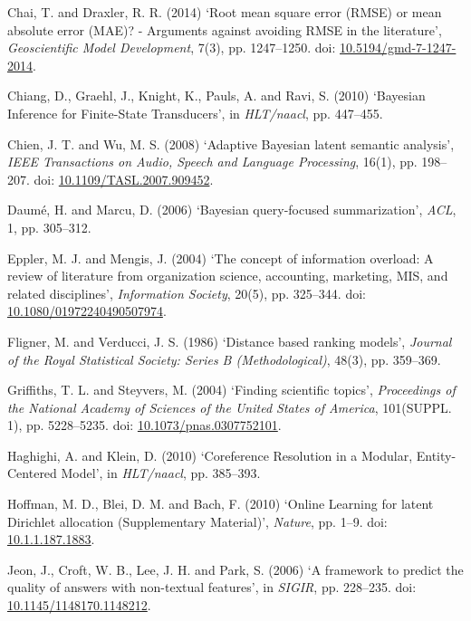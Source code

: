 \documentclass[11pt,preprint, authoryear]{article}
\begin{document}
\hypertarget{ref-Chai2014}{}
Chai, T. and Draxler, R. R. (2014) `Root mean square error (RMSE) or
mean absolute error (MAE)? - Arguments against avoiding RMSE in the
literature', \emph{Geoscientific Model Development}, 7(3), pp.
1247--1250. doi:
\href{https://doi.org/10.5194/gmd-7-1247-2014}{10.5194/gmd-7-1247-2014}.

\hypertarget{ref-Chiang2010}{}
Chiang, D., Graehl, J., Knight, K., Pauls, A. and Ravi, S. (2010)
`Bayesian Inference for Finite-State Transducers', in \emph{HLT/naacl},
pp. 447--455.

\hypertarget{ref-Chien2008}{}
Chien, J. T. and Wu, M. S. (2008) `Adaptive Bayesian latent semantic
analysis', \emph{IEEE Transactions on Audio, Speech and Language
Processing}, 16(1), pp. 198--207. doi:
\href{https://doi.org/10.1109/TASL.2007.909452}{10.1109/TASL.2007.909452}.

\hypertarget{ref-Daume2006}{}
Daumé, H. and Marcu, D. (2006) `Bayesian query-focused summarization',
\emph{ACL}, 1, pp. 305--312.

\hypertarget{ref-Eppler2004}{}
Eppler, M. J. and Mengis, J. (2004) `The concept of information
overload: A review of literature from organization science, accounting,
marketing, MIS, and related disciplines', \emph{Information Society},
20(5), pp. 325--344. doi:
\href{https://doi.org/10.1080/01972240490507974}{10.1080/01972240490507974}.

\hypertarget{ref-Fligner1986}{}
Fligner, M. and Verducci, J. S. (1986) `Distance based ranking models',
\emph{Journal of the Royal Statistical Society: Series B
(Methodological)}, 48(3), pp. 359--369.

\hypertarget{ref-Griffiths2004}{}
Griffiths, T. L. and Steyvers, M. (2004) `Finding scientific topics',
\emph{Proceedings of the National Academy of Sciences of the United
States of America}, 101(SUPPL. 1), pp. 5228--5235. doi:
\href{https://doi.org/10.1073/pnas.0307752101}{10.1073/pnas.0307752101}.

\hypertarget{ref-Haghighi2010}{}
Haghighi, A. and Klein, D. (2010) `Coreference Resolution in a Modular,
Entity-Centered Model', in \emph{HLT/naacl}, pp. 385--393.

\hypertarget{ref-Hoffman2010}{}
Hoffman, M. D., Blei, D. M. and Bach, F. (2010) `Online Learning for
latent Dirichlet allocation (Supplementary Material)', \emph{Nature},
pp. 1--9. doi: \href{https://doi.org/10.1.1.187.1883}{10.1.1.187.1883}.

\hypertarget{ref-Jeon2006}{}
Jeon, J., Croft, W. B., Lee, J. H. and Park, S. (2006) `A framework to
predict the quality of answers with non-textual features', in
\emph{SIGIR}, pp. 228--235. doi:
\href{https://doi.org/10.1145/1148170.1148212}{10.1145/1148170.1148212}.
\end{document}
